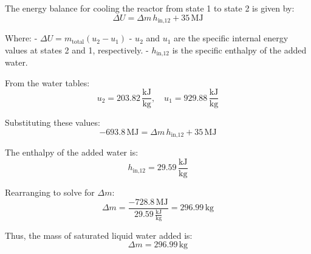 The energy balance for cooling the reactor from state 1 to state 2 is given by:  
\[
\Delta U = \Delta m \, h_{\text{in,12}} + 35 \, \text{MJ}
\]  

Where:  
- \( \Delta U = m_{\text{total}} \left( u_2 - u_1 \right) \)  
- \( u_2 \) and \( u_1 \) are the specific internal energy values at states 2 and 1, respectively.  
- \( h_{\text{in,12}} \) is the specific enthalpy of the added water.  

From the water tables:  
\[
u_2 = 203.82 \, \frac{\text{kJ}}{\text{kg}}, \quad u_1 = 929.88 \, \frac{\text{kJ}}{\text{kg}}
\]  

Substituting these values:  
\[
-693.8 \, \text{MJ} = \Delta m \, h_{\text{in,12}} + 35 \, \text{MJ}
\]  

The enthalpy of the added water is:  
\[
h_{\text{in,12}} = 29.59 \, \frac{\text{kJ}}{\text{kg}}
\]  

Rearranging to solve for \( \Delta m \):  
\[
\Delta m = \frac{-728.8 \, \text{MJ}}{29.59 \, \frac{\text{kJ}}{\text{kg}}} = 296.99 \, \text{kg}
\]  

Thus, the mass of saturated liquid water added is:  
\[
\Delta m = 296.99 \, \text{kg}
\]